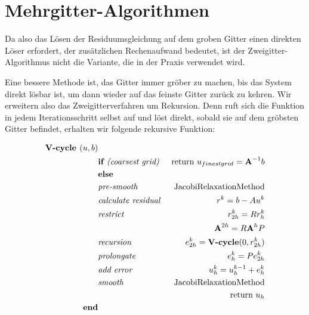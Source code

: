 \section{Mehrgitter-Algorithmen}\label{s.Mehrgitteralgorithmus}

Da also das Lösen der Residuumsgleichung auf dem groben Gitter einen direkten Löser erfordert, der zusätzlichen Rechenaufwand bedeutet, ist der Zweigitter-Algorithmus nicht die Variante, die in der Praxis verwendet wird.

Eine bessere Methode ist, das Gitter immer gröber zu machen, bis das System direkt lösbar ist, um dann wieder auf das feinste Gitter zurück zu kehren. Wir erweitern also das Zweigitterverfahren um Rekursion. Denn ruft sich die Funktion in jedem Iterationsschritt selbst auf und löst direkt, sobald sie auf dem gröbsten Gitter befindet, erhalten wir folgende rekursive Funktion:

\begin{eqnarray}
\textbf{V-cycle }(u,b)                         & \notag \\
&\textbf{if }\textit{(coarsest grid) }&\textnormal{return } u_{finest grid}={\textbf{A}}^{-1}b \notag \\
&\textbf{else }                                                & \notag \\
&\textit{pre-smooth }                                 &\textnormal{JacobiRelaxationMethod} \notag \\
&\textit{calculate residual }                &r^{k} = b - Au^{k} \notag \\
&\textit{restrict }                                 &r^{k}_{2h}=Rr^{k}_{h} \notag \\
&                                                                        &{\textbf{A}}^{2h} = R{\textbf{A}}^{h}P \notag \\
&\textit{recursion }                                &e^{k}_{2h} = \textbf{V-cycle}(0,r^{k}_{2h}) \notag \\
&\textit{prolongate }                                &e^{k}_{h} = Pe^{k}_{2h} \notag \\
&\textit{add error }                                &u^{k}_{h} = u^{k-1}_{h} + e^{k}_{h} \notag \\
&\textit{smooth }                                        &\textnormal{JacobiRelaxationMethod} \notag \\
&                                                                        &\textnormal{return } u_{h} \notag \\
\textbf{end}                                                & \notag
\end{eqnarray}

